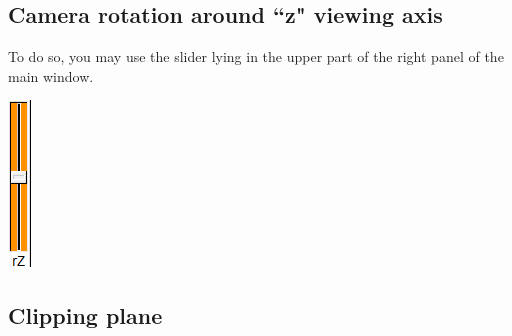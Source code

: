 \subsection{Camera rotation around ``z" viewing axis}

\begin{minipage}{0.7\textwidth}
To do so, you may use the slider lying in the upper part of the right panel of the main window.
\end{minipage}    
\begin{minipage}{0.25\textwidth}\centering
  \includegraphics[scale=0.5]{images/Icons/Rotation_z.png}
 \end{minipage}    



\subsection{Clipping plane}

